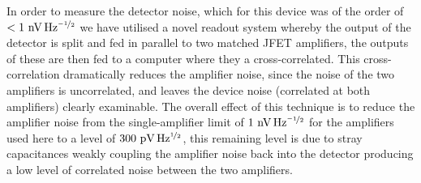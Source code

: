 \documentclass[journal, a4paper]{IEEEtran}
\begin{document}
In order to measure the detector noise, which for this device was of the order of $< 1~\mathrm{nV\,Hz^{\nicefrac{-1}{2}}}$ we have utilised a novel readout system whereby the output of the detector is split and fed in parallel to two matched JFET amplifiers, the outputs of these are then fed to a computer where they a cross-correlated. This cross-correlation dramatically reduces the amplifier noise, since the noise of the two amplifiers is uncorrelated, and leaves the device noise (correlated at both amplifiers) clearly examinable. The overall effect of this technique is to reduce the amplifier noise from the single-amplifier limit of $1~\mathrm{nV\,Hz^{\nicefrac{-1}{2}}}$ for the amplifiers used here to a level of $300~\mathrm{pV\,Hz^{\nicefrac{1}{2}}}$, this remaining level is due to stray capacitances weakly coupling the amplifier noise back into the detector producing a low level of correlated noise between the two amplifiers.%
%
\end{document}

